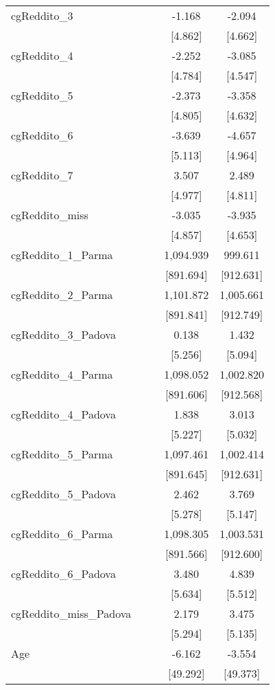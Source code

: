 \documentclass[]{article}
\begin{document}
\begin{tabular}{lcccc}
cgReddito\_3 &  &  & -1.168 & -2.094 \\
 &  &  & [4.862] & [4.662] \\
cgReddito\_4 &  &  & -2.252 & -3.085 \\
 &  &  & [4.784] & [4.547] \\
cgReddito\_5 &  &  & -2.373 & -3.358 \\
 &  &  & [4.805] & [4.632] \\
cgReddito\_6 &  &  & -3.639 & -4.657 \\
 &  &  & [5.113] & [4.964] \\
cgReddito\_7 &  &  & 3.507 & 2.489 \\
 &  &  & [4.977] & [4.811] \\
cgReddito\_miss &  &  & -3.035 & -3.935 \\
 &  &  & [4.857] & [4.653] \\
cgReddito\_1\_Parma &  &  & 1,094.939 & 999.611 \\
 &  &  & [891.694] & [912.631] \\
cgReddito\_2\_Parma &  &  & 1,101.872 & 1,005.661 \\
 &  &  & [891.841] & [912.749] \\
cgReddito\_3\_Padova &  &  & 0.138 & 1.432 \\
 &  &  & [5.256] & [5.094] \\
cgReddito\_4\_Parma &  &  & 1,098.052 & 1,002.820 \\
 &  &  & [891.606] & [912.568] \\
cgReddito\_4\_Padova &  &  & 1.838 & 3.013 \\
 &  &  & [5.227] & [5.032] \\
cgReddito\_5\_Parma &  &  & 1,097.461 & 1,002.414 \\
 &  &  & [891.645] & [912.631] \\
cgReddito\_5\_Padova &  &  & 2.462 & 3.769 \\
 &  &  & [5.278] & [5.147] \\
cgReddito\_6\_Parma &  &  & 1,098.305 & 1,003.531 \\
 &  &  & [891.566] & [912.600] \\
cgReddito\_6\_Padova &  &  & 3.480 & 4.839 \\
 &  &  & [5.634] & [5.512] \\
cgReddito\_miss\_Padova &  &  & 2.179 & 3.475 \\
 &  &  & [5.294] & [5.135] \\
Age &  &  & -6.162 & -3.554 \\
 &  &  & [49.292] & [49.373] \\

\end{tabular}
\end{document}
